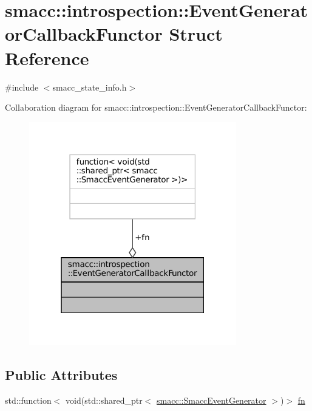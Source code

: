 \hypertarget{structsmacc_1_1introspection_1_1EventGeneratorCallbackFunctor}{}\section{smacc\+:\+:introspection\+:\+:Event\+Generator\+Callback\+Functor Struct Reference}
\label{structsmacc_1_1introspection_1_1EventGeneratorCallbackFunctor}


{\ttfamily \#include $<$smacc\+\_\+state\+\_\+info.\+h$>$}



Collaboration diagram for smacc\+:\+:introspection\+:\+:Event\+Generator\+Callback\+Functor\+:
\nopagebreak
\begin{figure}[H]
\begin{center}
\leavevmode
\includegraphics[width=256pt]{structsmacc_1_1introspection_1_1EventGeneratorCallbackFunctor__coll__graph}
\end{center}
\end{figure}
\subsection*{Public Attributes}
\begin{DoxyCompactItemize}
\item 
std\+::function$<$ void(std\+::shared\+\_\+ptr$<$ \hyperlink{classsmacc_1_1SmaccEventGenerator}{smacc\+::\+Smacc\+Event\+Generator} $>$)$>$ \hyperlink{structsmacc_1_1introspection_1_1EventGeneratorCallbackFunctor_a5c0616f83593c0d6b6de7a18d18c9f15}{fn}
\end{DoxyCompactItemize}


